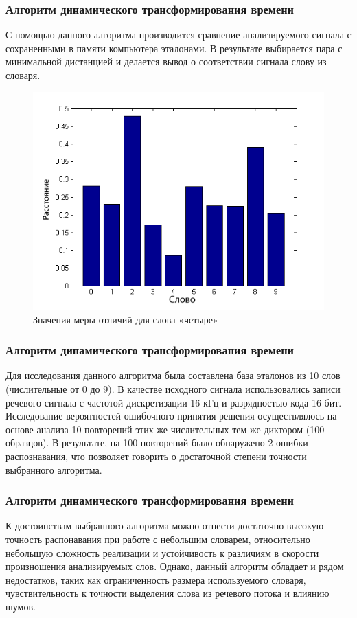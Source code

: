 \documentclass[slidestop, compress, mathserif, blackandwhite, utf8, serif, slidescentered]{beamer}
\begin{document}
\begin{frame}[plain]
	\frametitle{Алгоритм динамического трансформирования времени}
	
	С помощью данного алгоритма производится сравнение анализируемого сигнала с сохраненными в памяти компьютера эталонами. В результате выбирается пара с минимальной дистанцией и делается вывод о соответствии сигнала слову из словаря.

	\begin{figure}[H]	
	\centering
	\includegraphics[width=.44\textwidth]{../dist_4.png}
	\caption{Значения меры отличий для слова «четыре»}
	\label{dist_4}
	\end{figure} 

\end{frame}

\begin{frame}[plain]
	\frametitle{Алгоритм динамического трансформирования времени}
	Для исследования данного алгоритма была составлена база эталонов из 10 слов (числительные от 0 до 9). В качестве исходного сигнала использовались записи речевого сигнала с частотой дискретизации 16 кГц и разрядностью кода 16 бит. Исследование вероятностей ошибочного принятия решения осуществлялось на основе анализа 10 повторений этих же числительных тем же диктором (100 образцов). В результате, на 100 повторений было обнаружено 2 ошибки распознавания, что позволяет говорить о достаточной степени точности выбранного алгоритма.
\end{frame}	

\begin{frame}[plain]
	\frametitle{Алгоритм динамического трансформирования времени}
	К достоинствам выбранного алгоритма можно отнести достаточно высокую точность распонавания при работе с небольшим словарем, относительно небольшую сложность реализации и устойчивость к различиям в скорости произношения анализируемых слов. Однако, данный алгоритм обладает и рядом недостатков, таких как ограниченность размера используемого словаря, чувствительность к точности выделения слова из речевого потока и влиянию шумов.
\end{frame}	
\end{document}
